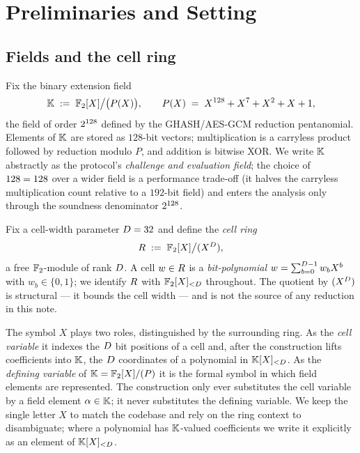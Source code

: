 \section{Preliminaries and Setting}
\label{sec:prelim}

\subsection{Fields and the cell ring}

Fix the binary extension field
\[
  \mathbb{K} \;:=\; \mathbb{F}_2[X]\big/\bigl(P(X)\bigr),
  \qquad
  P(X) \;=\; X^{128} + X^7 + X^2 + X + 1,
\]
the field of order $2^{128}$ defined by the GHASH/AES-GCM reduction
pentanomial. Elements of $\mathbb{K}$ are stored as $128$-bit vectors;
multiplication is a carryless product followed by reduction modulo $P$,
and addition is bitwise XOR. We write $\mathbb{K}$ abstractly as the protocol's
\emph{challenge and evaluation field}; the choice of $128 = 128$ over
a wider field is a performance trade-off (it halves the carryless
multiplication count relative to a $192$-bit field) and enters the
analysis only through the soundness denominator $2^{128}$.

Fix a cell-width parameter $D = 32$ and define the \emph{cell ring}
\[
  R \;:=\; \mathbb{F}_2[X]\big/(X^{D}),
\]
a free $\mathbb{F}_2$-module of rank $D$. A cell $w \in R$ is a
\emph{bit-polynomial} $w = \sum_{b=0}^{D-1} w_b X^b$ with
$w_b \in \{0,1\}$; we identify $R$ with $\mathbb{F}_2[X]_{<D}$
throughout. The quotient by $(X^{D})$ is structural --- it bounds
the cell width --- and is not the source of any reduction in this note.

\begin{remark}
\label{rem:two-X}
The symbol $X$ plays two roles, distinguished by the surrounding ring.
As the \emph{cell variable} it indexes the $D$ bit positions of a
cell and, after the construction lifts coefficients into $\mathbb{K}$, the
$D$ coordinates of a polynomial in $\mathbb{K}[X]_{<D}$. As the
\emph{defining variable} of $\mathbb{K} = \mathbb{F}_2[X]/(P)$ it is the formal symbol
in which field elements are represented. The construction only ever
substitutes the cell variable by a field element $\alpha \in \mathbb{K}$; it
never substitutes the defining variable. We keep the single letter $X$
to match the codebase and rely on the ring context to disambiguate;
where a polynomial has $\mathbb{K}$-valued coefficients we write it explicitly
as an element of $\mathbb{K}[X]_{<D}$.
\end{remark}

